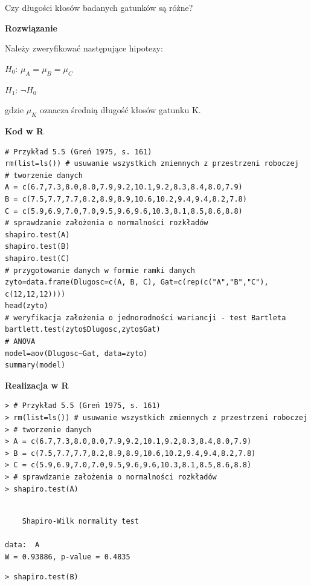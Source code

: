 \documentclass[12pt,B5paper,]{book}
\begin{document}
Czy długości kłosów badanych gatunków są różne? \vspace{0.8cm}

\textbf{Rozwiązanie}

Należy zweryfikować następujące hipotezy:

\hspace*{5cm} \(H_0\): \(\mu_A = \mu_B = \mu_C\)

\hspace*{5cm} \(H_1\): \(\neg H_0\)

gdzie \(\mu_K\) oznacza średnią długość kłosów gatunku K.

\vspace{0.8cm} \textbf{Kod w R}

\begin{verbatim}
# Przykład 5.5 (Greń 1975, s. 161)
rm(list=ls()) # usuwanie wszystkich zmiennych z przestrzeni roboczej
# tworzenie danych
A = c(6.7,7.3,8.0,8.0,7.9,9.2,10.1,9.2,8.3,8.4,8.0,7.9)
B = c(7.5,7.7,7.7,8.2,8.9,8.9,10.6,10.2,9.4,9.4,8.2,7.8)     
C = c(5.9,6.9,7.0,7.0,9.5,9.6,9.6,10.3,8.1,8.5,8.6,8.8) 
# sprawdzanie założenia o normalności rozkładów 
shapiro.test(A)
shapiro.test(B)
shapiro.test(C)
# przygotowanie danych w formie ramki danych
zyto=data.frame(Dlugosc=c(A, B, C), Gat=c(rep(c("A","B","C"), c(12,12,12))))
head(zyto)
# weryfikacja założenia o jednorodności wariancji - test Bartleta
bartlett.test(zyto$Dlugosc,zyto$Gat)
# ANOVA
model=aov(Dlugosc~Gat, data=zyto)
summary(model)
\end{verbatim}

\vspace{0.8cm} \textbf{Realizacja w R}

\begin{verbatim}
> # Przykład 5.5 (Greń 1975, s. 161)
> rm(list=ls()) # usuwanie wszystkich zmiennych z przestrzeni roboczej
> # tworzenie danych
> A = c(6.7,7.3,8.0,8.0,7.9,9.2,10.1,9.2,8.3,8.4,8.0,7.9)
> B = c(7.5,7.7,7.7,8.2,8.9,8.9,10.6,10.2,9.4,9.4,8.2,7.8)     
> C = c(5.9,6.9,7.0,7.0,9.5,9.6,9.6,10.3,8.1,8.5,8.6,8.8) 
> # sprawdzanie założenia o normalności rozkładów 
> shapiro.test(A)
\end{verbatim}

\begin{verbatim}

    Shapiro-Wilk normality test

data:  A
W = 0.93886, p-value = 0.4835
\end{verbatim}

\begin{verbatim}
> shapiro.test(B)
\end{verbatim}
\end{document}
